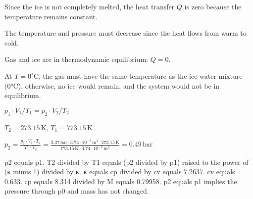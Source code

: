 Since the ice is not completely melted, the heat transfer \( Q \) is zero because the temperature remains constant.  

The temperature and pressure must decrease since the heat flows from warm to cold.  

Gas and ice are in thermodynamic equilibrium: \( Q = 0 \).  

At \( T = 0^\circ \text{C} \), the gas must have the same temperature as the ice-water mixture (0°C), otherwise, no ice would remain, and the system would not be in equilibrium.  

\( p_{1} \cdot V_{1} / T_{1} = p_{2} \cdot V_{2} / T_{2} \)  

\( T_{2} = 273.15 \, \text{K} \), \( T_{1} = 773.15 \, \text{K} \)  

\( p_{2} = \frac{p_{1} \cdot V_{1} \cdot T_{2}}{T_{1} \cdot V_{2}} = \frac{2.37 \, \text{bar} \cdot 3.74 \cdot 10^{-3} \, \text{m}^3 \cdot 273.15 \, \text{K}}{773.15 \, \text{K} \cdot 3.74 \cdot 10^{-3} \, \text{m}^3} = 0.49 \, \text{bar} \)

p2 equals p1.  
T2 divided by T1 equals (p2 divided by p1) raised to the power of (κ minus 1) divided by κ.  
κ equals cp divided by cv equals 7.2637.  
cv equals 0.633.  
cp equals 8.314 divided by M equals 0.79958.  
p2 equals p1 implies the pressure through p0 and mass has not changed.
